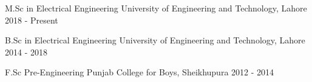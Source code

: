 \begin{cventries}
	\cventry
	{M.Sc in Electrical Engineering \iffalse(0.123/4.0)\fi}
	{University of Engineering and Technology, Lahore}
	{}
	{2018 - Present}
	{}
	
	\cventry
	{B.Sc in Electrical Engineering \iffalse(0.123/4.0)\fi}
	{University of Engineering and Technology, Lahore}
	{}
	{2014 - 2018}
	{}
	  
	\cventry
	{F.Sc Pre-Engineering \iffalse(0123/1100)\fi}
	{Punjab College for Boys, Sheikhupura}
	{}
	{2012 - 2014}
	{}
	
		
\end{cventries}
